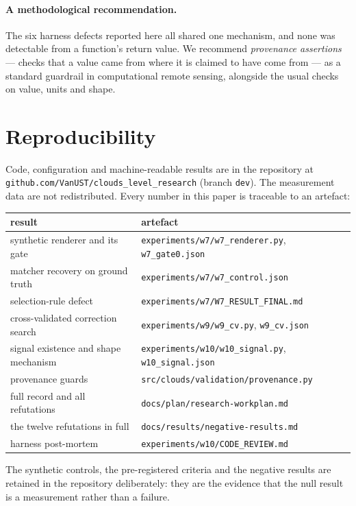 \documentclass[11pt,a4paper]{article}
\begin{document}
\paragraph{A methodological recommendation.} The six harness defects reported here all shared
one mechanism, and none was detectable from a function's return value. We recommend
\emph{provenance assertions} --- checks that a value came from where it is claimed to have come
from --- as a standard guardrail in computational remote sensing, alongside the usual checks
on value, units and shape.

\section*{Reproducibility}

Code, configuration and machine-readable results are in the repository at
\texttt{github.com/VanUST/clouds\_level\_research} (branch \texttt{dev}). The measurement data
are not redistributed. Every number in this paper is traceable to an artefact:

\begin{table}[h]
\centering
\small
\begin{tabular}{@{}ll@{}}
\toprule
result & artefact \\
\midrule
synthetic renderer and its gate & \texttt{experiments/w7/w7\_renderer.py}, \texttt{w7\_gate0.json} \\
matcher recovery on ground truth & \texttt{experiments/w7/w7\_control.json} \\
selection-rule defect & \texttt{experiments/w7/W7\_RESULT\_FINAL.md} \\
cross-validated correction search & \texttt{experiments/w9/w9\_cv.py}, \texttt{w9\_cv.json} \\
signal existence and shape mechanism & \texttt{experiments/w10/w10\_signal.py}, \texttt{w10\_signal.json} \\
provenance guards & \texttt{src/clouds/validation/provenance.py} \\
full record and all refutations & \texttt{docs/plan/research-workplan.md} \\
the twelve refutations in full & \texttt{docs/results/negative-results.md} \\
harness post-mortem & \texttt{experiments/w10/CODE\_REVIEW.md} \\
\bottomrule
\end{tabular}
\end{table}

\noindent
The synthetic controls, the pre-registered criteria and the negative results are retained in
the repository deliberately: they are the evidence that the null result is a measurement rather
than a failure.
\end{document}

